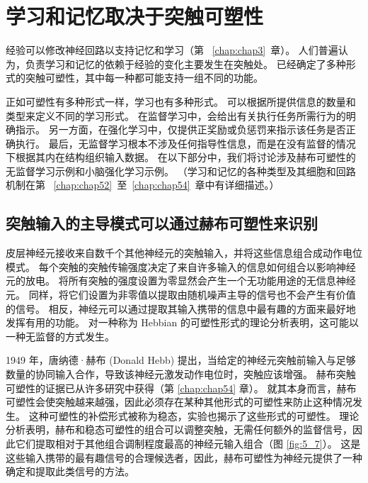\section{学习和记忆取决于突触可塑性}

经验可以修改神经回路以支持记忆和学习（第 ~\ref{chap:chap3}~章）。 
人们普遍认为，负责学习和记忆的依赖于经验的变化主要发生在突触处。 
已经确定了多种形式的突触可塑性，其中每一种都可能支持一组不同的功能。


正如可塑性有多种形式一样，学习也有多种形式。
可以根据所提供信息的数量和类型来定义不同的学习形式。
在监督学习中，会给出有关执行任务所需行为的明确指示。
另一方面，在强化学习中，仅提供正奖励或负惩罚来指示该任务是否正确执行。
最后，无监督学习根本不涉及任何指导性信息，而是在没有监督的情况下根据其内在结构组织输入数据。
在以下部分中，我们将讨论涉及赫布可塑性的无监督学习示例和小脑强化学习示例。
（学习和记忆的各种类型及其细胞和回路机制在第 ~\ref{chap:chap52}~至~\ref{chap:chap54}~章中有详细描述。）



\subsection{突触输入的主导模式可以通过赫布可塑性来识别}

皮层神经元接收来自数千个其他神经元的突触输入，并将这些信息组合成动作电位模式。
每个突触的突触传输强度决定了来自许多输入的信息如何组合以影响神经元的放电。
将所有突触的强度设置为零显然会产生一个无功能用途的无信息神经元。
同样，将它们设置为非零值以提取由随机噪声主导的信号也不会产生有价值的信号。
相反，神经元可以通过提取其输入携带的信息中最有趣的方面来最好地发挥有用的功能。
对一种称为 Hebbian 的可塑性形式的理论分析表明，这可能以一种无监督的方式发生。


1949 年，唐纳德·赫布 (Donald Hebb) 提出，当给定的神经元突触前输入与足够数量的协同输入合作，导致该神经元激发动作电位时，突触应该增强。 
赫布突触可塑性的证据已从许多研究中获得（第 \ref{chap:chap54} 章）。 
就其本身而言，赫布可塑性会使突触越来越强，因此必须存在某种其他形式的可塑性来防止这种情况发生。 
这种可塑性的补偿形式被称为稳态，实验也揭示了这些形式的可塑性。 
理论分析表明，赫布和稳态可塑性的组合可以调整突触，无需任何额外的监督信号，因此它们提取相对于其他组合调制程度最高的神经元输入组合（图 \ref{fig:5_7}）。 
这是这些输入携带的最有趣信号的合理候选者，因此，赫布可塑性为神经元提供了一种确定和提取此类信号的方法。

